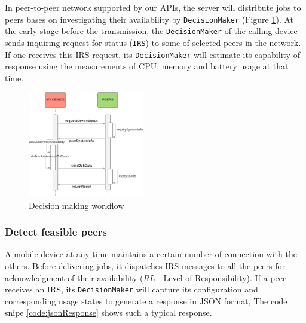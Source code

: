 \documentclass[conference]{IEEEtran}
\begin{document}
In peer-to-peer network supported by our APIs, the server will distribute jobs to peers bases on investigating their availability by \texttt{DecisionMaker} (Figure \ref{fig:checkStatus}). At the early stage before the transmission, the \texttt{DecisionMaker} of the calling device sends inquiring request for status (\texttt{IRS}) to some of selected peers in the network. If one receives this IRS request, its \texttt{DecisionMaker} will estimate its capability of response using the measurements of CPU, memory and battery usage at that time. 

\begin{figure}[H]
\centerline {
\includegraphics[width=0.45\textwidth, natwidth=915, natheight=837]{data/checkStatusFlow}
}
\caption{Decision making workflow}
\label{fig:checkStatus}
\end{figure}

\subsubsection{Detect feasible peers}\label{ss_dfp}

A mobile device at any time maintains a certain number of connection with the others. Before delivering jobs, it dispatches IRS messages to all the peers for acknowledgment of their availability ($RL$ - Level of Responsibility). If a peer receives an IRS, its \texttt{DecisionMaker} will capture its configuration and corresponding usage states to generate a response in JSON format, The code snipe \ref{code:jsonResponse} shows such a typical response.\\

\noindent {}	
\end{document}

